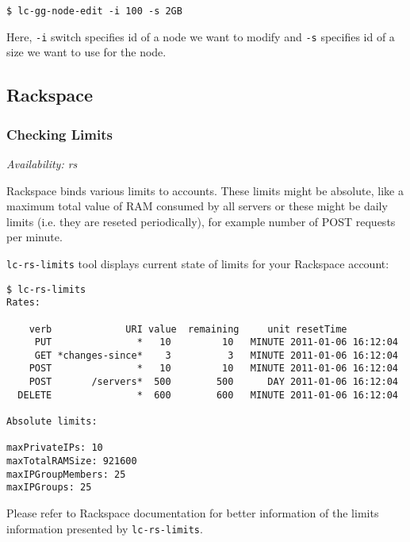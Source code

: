 \documentclass[a4paper]{report}
\begin{document}
\begin{verbatim}
$ lc-gg-node-edit -i 100 -s 2GB
\end{verbatim}

Here, \texttt{-i} switch specifies id of a node we want to modify and \texttt{-s} specifies
id of a size we want to use for the node.

\subsection{Rackspace}

\subsubsection{Checking Limits}

\textit{Availability: rs}

Rackspace binds various limits to accounts. These limits might be absolute, like a
maximum total value of RAM consumed by all servers or these might be daily limits
(i.e. they are reseted periodically), for example number of POST requests per minute.

\texttt{lc-rs-limits} tool displays current state of limits for your Rackspace account:

\begin{verbatim}
$ lc-rs-limits
Rates:
    
    verb             URI value  remaining     unit resetTime
     PUT               *   10         10   MINUTE 2011-01-06 16:12:04
     GET *changes-since*    3          3   MINUTE 2011-01-06 16:12:04
    POST               *   10         10   MINUTE 2011-01-06 16:12:04
    POST       /servers*  500        500      DAY 2011-01-06 16:12:04
  DELETE               *  600        600   MINUTE 2011-01-06 16:12:04

Absolute limits:

maxPrivateIPs: 10
maxTotalRAMSize: 921600
maxIPGroupMembers: 25
maxIPGroups: 25
\end{verbatim}

Please refer to Rackspace documentation for better information of the
limits information presented by \texttt{lc-rs-limits}.
\end{document}
